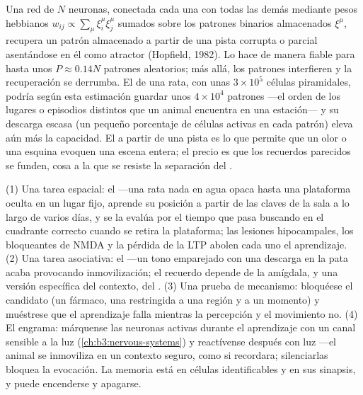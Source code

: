 \begin{proposition}\label{prop:b3:learning-memory:capacity}
Una red de $N$ neuronas, conectada cada una con todas las demás
mediante pesos hebbianos $w_{ij} \propto \sum_{\mu}\xi_{i}^{\mu}\xi_{j}^{\mu}$
sumados sobre los patrones binarios almacenados $\xi^{\mu}$, recupera
un patrón almacenado a partir de una pista corrupta o parcial
asentándose en él como atractor (Hopfield, 1982). Lo hace de manera
fiable para hasta unos $P
\approx 0.14N$ patrones aleatorios; más allá, los patrones interfieren
y la recuperación se derrumba. El  de una rata, con unas
$3\times 10^{5}$ células piramidales, podría según esta estimación
guardar unos $4\times 10^{4}$ patrones ---el orden de los lugares o
episodios distintos que un animal encuentra en una estación--- y su
descarga escasa (un pequeño porcentaje de células activas en cada
patrón) eleva aún más la capacidad. El  a partir
de una pista es lo que permite que un olor o una esquina evoquen una
escena entera; el precio es que los recuerdos parecidos se funden, cosa
a la que se resiste la separación del .
\end{proposition}
\admitted

\begin{method}\label{met:b3:learning-memory:tests}
(1) Una tarea espacial: el  ---una rata
nada en agua opaca hasta una plataforma oculta en un lugar fijo,
aprende su posición a partir de las claves de la sala a lo largo de
varios días, y se la evalúa por el tiempo que pasa buscando en el
cuadrante correcto cuando se retira la plataforma; las lesiones
hipocampales, los bloqueantes de NMDA y la pérdida de la LTP abolen
cada uno el aprendizaje. (2) Una tarea asociativa: el  ---un tono emparejado con una descarga en la pata acaba
provocando inmovilización; el recuerdo depende de la amígdala, y una
versión específica del contexto, del . (3) Una prueba de
mecanismo: bloquéese el candidato (un fármaco, una 
restringida a una región y a un momento) y muéstrese que el aprendizaje
falla mientras la percepción y el movimiento no. (4) El engrama:
márquense las neuronas activas durante el aprendizaje con un canal
sensible a la luz (\cref{ch:b3:nervous-systems}) y reactívense después
con luz ---el animal se inmoviliza en un contexto seguro, como si
recordara; silenciarlas bloquea la evocación. La memoria está en
células identificables y en sus sinapsis, y puede encenderse y
apagarse.
\end{method}

